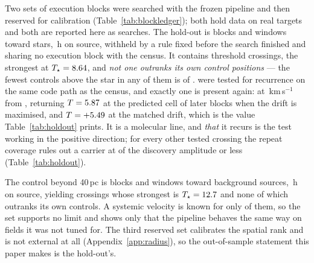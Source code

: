 Two sets of execution blocks were searched with the frozen pipeline and then
reserved for calibration (Table~\ref{tab:blockledger}); both hold data on real
targets and both are reported here as searches. The hold-out is \HoNBlock{}
blocks and \HoNWin{} windows toward \HoNStar{} stars, \HoHours\,h on source,
withheld by a rule fixed before the search finished and sharing no execution
block with the census. It contains \HoNCross{} threshold crossings, the
strongest at $T_\star=8.64$, and \emph{not one outranks its own control
positions} --- the fewest controls above the star in any of them is
\HoNCtrlMin{} of \NCtrl. \HoNTested{} were tested for recurrence on the same
code path as the census, and exactly one is present again: \HoRecStar{} at
\HoRecDv\,km\,s$^{-1}$ from \HoRecLine, returning $T=5.87$ at the
predicted cell of \HoRecNRep{} later blocks when the drift is maximised,
and $T=+5.49$ at the matched drift, which is the value
Table~\ref{tab:holdout} prints. It is a molecular line, and
\emph{that} it recurs is the test working in the positive direction; for every
other tested crossing the repeat coverage rules out a carrier at \HoFracMax{}
of the discovery amplitude or less (Table~\ref{tab:holdout}).

The control beyond 40\,pc is \OosNBlock{} blocks and \OosNWin{} windows toward
\OosNStar{} background sources, \OosHours\,h on source, yielding \OosNCross{}
crossings whose strongest is $T_\star=12.7$ and none of which outranks its
own controls. A systemic velocity is known for only \OosNVsys{} of them, so
the set supports no limit and shows only that the pipeline behaves the same way
on fields it was not tuned for. The third reserved set calibrates the spatial
rank and is not external at all (Appendix~\ref{app:radius}), so the
out-of-sample statement this paper makes is the hold-out's.

